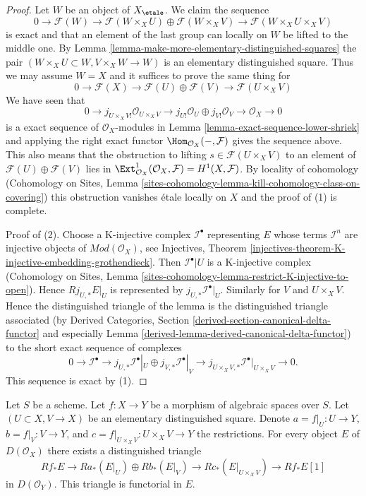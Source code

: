 \begin{proof}
Let $W$ be an object of $X_\etale$. We claim the sequence
$$
0 \to
\mathcal{F}(W) \to
\mathcal{F}(W \times_X U) \oplus \mathcal{F}(W \times_X V) \to
\mathcal{F}(W \times_X U \times_X V)
$$
is exact and that an element of the last group can locally on $W$
be lifted to the middle one.
By Lemma \ref{lemma-make-more-elementary-distinguished-squares}
the pair $(W \times_X U \subset W, V \times_X W \to W)$ is an elementary
distinguished square. Thus we may assume $W = X$ and it suffices
to prove the same thing for
$$
0 \to
\mathcal{F}(X) \to
\mathcal{F}(U) \oplus \mathcal{F}(V) \to
\mathcal{F}(U \times_X V)
$$
We have seen that
$$
0 \to j_{U \times_X V!}\mathcal{O}_{U \times_X V}
\to j_{U!}\mathcal{O}_U \oplus
j_{V!}\mathcal{O}_V \to
\mathcal{O}_X \to 0
$$
is a exact sequence of $\mathcal{O}_X$-modules in
Lemma \ref{lemma-exact-sequence-lower-shriek} and applying
the right exact functor $\Hom_{\mathcal{O}_X}(- , \mathcal{F})$
gives the sequence above. This also means that the obstruction
to lifting $s \in \mathcal{F}(U \times_X V)$ to
an element of $\mathcal{F}(U) \oplus \mathcal{F}(V)$ lies in
$\Ext^1_{\mathcal{O}_X}(\mathcal{O}_X, \mathcal{F}) =
H^1(X, \mathcal{F})$. By locality of cohomology
(Cohomology on Sites, Lemma
\ref{sites-cohomology-lemma-kill-cohomology-class-on-covering})
this obstruction vanishes \'etale locally on $X$ and the proof
of (1) is complete.

\medskip\noindent
Proof of (2).
Choose a K-injective complex $\mathcal{I}^\bullet$ representing $E$
whose terms $\mathcal{I}^n$ are injective objects of
$\textit{Mod}(\mathcal{O}_X)$, see Injectives, Theorem
\ref{injectives-theorem-K-injective-embedding-grothendieck}.
Then $\mathcal{I}^\bullet|U$ is a K-injective complex
(Cohomology on Sites, Lemma
\ref{sites-cohomology-lemma-restrict-K-injective-to-open}).
Hence $Rj_{U, *}E|_U$ is represented by $j_{U, *}\mathcal{I}^\bullet|_U$.
Similarly for $V$ and $U \times_X V$. Hence the distinguished triangle
of the lemma is the distinguished triangle associated (by
Derived Categories, Section
\ref{derived-section-canonical-delta-functor} and especially
Lemma \ref{derived-lemma-derived-canonical-delta-functor})
to the short exact sequence of complexes
$$
0 \to
\mathcal{I}^\bullet \to
j_{U, *}\mathcal{I}^\bullet|_U \oplus j_{V, *}\mathcal{I}^\bullet|_V \to
j_{U \times_X V, *}\mathcal{I}^\bullet|_{U \times_X V} \to
0.
$$
This sequence is exact by (1).
\end{proof}

\begin{lemma}
\label{lemma-unbounded-relative-mayer-vietoris}
Let $S$ be a scheme. Let $f : X \to Y$ be a morphism of algebraic spaces
over $S$. Let $(U \subset X, V \to X)$ be an elementary distinguished square.
Denote $a = f|_U : U \to Y$, $b = f|_V : V \to Y$, and
$c = f|_{U \times_X V} : U \times_X V \to Y$ the restrictions.
For every object $E$ of $D(\mathcal{O}_X)$ there exists a
distinguished triangle
$$
Rf_*E \to
Ra_*(E|_U) \oplus Rb_*(E|_V) \to
Rc_*(E|_{U \times_X V}) \to
Rf_*E[1]
$$
in $D(\mathcal{O}_Y)$. This triangle is functorial in $E$.
\end{lemma}

